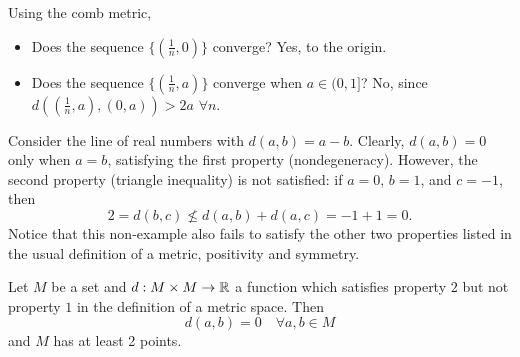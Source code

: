 Using the comb metric, 
\begin{itemize}
	\item Does the sequence $\{ (\frac{1}{n},0) \}$ converge? Yes, to the origin. 
	\item Does the sequence $\{ (\frac{1}{n},a) \}$ converge when $a \in (0,1]$? No, since $d((\frac{1}{n},a),(0,a)) > 2a$ $\forall n$. 
\end{itemize}
\begin{example}
	 Consider the line of real numbers with $d(a,b) = a-b$. Clearly, $d(a,b)=0$ only when $a=b$, satisfying the first property (nondegeneracy). However, the second property (triangle inequality) is not satisfied: if $a=0$, $b=1$, and $c=-1$, then
	\[2=d(b,c) \nleq d(a,b)+d(a,c)=-1+1=0.\]
	Notice that this non-example also fails to satisfy the other two properties listed in the usual definition of a metric, positivity and symmetry. 
\end{example}
\begin{example}
	Let $M$ be a set and $d:M\times M\to \mathbb R$ a function which satisfies property $2$ but not property $1$ in the definition of a metric space. Then
	\[d(a,b) = 0 \quad \forall a,b \in M\]
	and $M$ has at least 2 points. 
\end{example}
